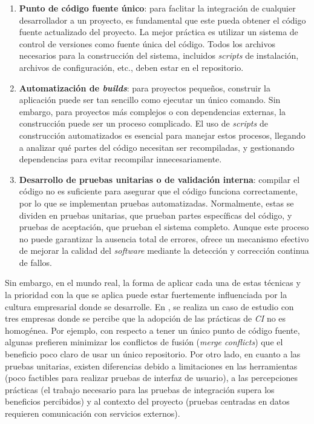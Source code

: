 \begin{enumerate}
      \item \textbf{Punto de código fuente único}: para faclitar la integración de cualquier
      desarrollador a un proyecto, es fundamental que este pueda obtener el código fuente
      actualizado del proyecto. La mejor práctica es utilizar un sistema de control de versiones
      como fuente única del código. Todos los archivos necesarios para la construcción del sistema,
      incluidos \textit{scripts} de instalación, archivos de configuración, etc., deben estar
      en el repositorio.
      \item \textbf{Automatización de \textit{builds}}: para proyectos pequeños, construir la
      aplicación puede ser tan sencillo como ejecutar un único comando. Sin embargo, para proyectos
      más complejos o con dependencias externas, la construcción puede ser un proceso complicado.
      El uso de \textit{scripts} de construcción automatizados es esencial para manejar estos
      procesos, llegando a analizar qué partes del código necesitan ser recompiladas, y gestionando
      dependencias para evitar recompilar innecesariamente.
      \item \textbf{Desarrollo de pruebas unitarias o de validación interna}: compilar el código
      no es suficiente para asegurar que el código funciona correctamente, por lo que se
      implementan pruebas automatizadas. Normalmente, estas se dividen en pruebas unitarias, que
      prueban partes específicas del código, y pruebas de aceptación, que prueban el sistema
      completo. Aunque este proceso no puede garantizar la ausencia total de errores, ofrece un
      mecanismo efectivo de mejorar la calidad del \textit{software} mediante la detección y
      corrección continua de fallos.
\end{enumerate}

Sin embargo, en el mundo real, la forma de aplicar cada una de estas técnicas y la prioridad con
la que se aplica puede estar fuertemente influenciada por la cultura empresarial donde
se desarrolle. En \cite{8}, se realiza un caso de estudio con tres empresas donde se percibe
que la adopción de las prácticas de \textit{CI} no es homogénea. Por ejemplo, con respecto a tener
un único punto de código fuente, algunas prefieren minimizar los conflictos de fusión
(\textit{merge conflicts}) que el beneficio poco claro de usar un único repositorio. Por otro
lado, en cuanto a las pruebas unitarias, existen diferencias debido a limitaciones en las
herramientas (poco factibles para realizar pruebas de interfaz de usuario), a las percepciones
prácticas (el trabajo necesario para las pruebas de integración supera los beneficios percibidos)
y al contexto del proyecto (pruebas centradas en datos requieren comunicación con servicios
externos).\\

